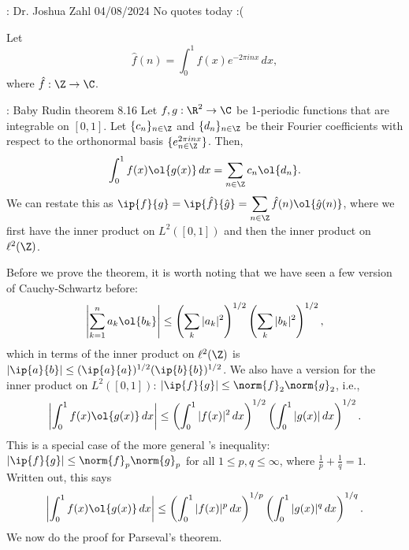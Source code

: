 \begin{nquote}{: Dr. Joshua Zahl 04/08/2024}
    No quotes today :(
\end{nquote}
\begin{notation}
    Let 
    \begin{equation*} 
        \hat{f}(n)=\int_0^1 f(x)e^{-2\pi inx} \, dx,
    \end{equation*} 
    where \(\hat{f}:\Z\to\C\).
\end{notation}

\begin{ntheorem}{: Baby Rudin theorem 8.16}
    Let \(f,g:\R^2\to\C\) be 1-periodic functions that are integrable on \([0,1]\). Let \(\{c_n\}_{n\in\Z}\) and \(\{d_n\}_{n\in\Z}\) be their Fourier coefficients with respect to the orthonormal basis \(\{e^{2\pi inx}_{n\in\Z}\}\). Then,
    \begin{equation*} 
        \int_0^1 f(x)\ol{g(x)} \, dx=\sum_{n\in\Z}c_n\ol{d_n}.
    \end{equation*}
    We can restate this as \(\ip{f}{g}=\ip{\hat{f}}{\hat{g}}=\displaystyle\sum_{n\in\Z}\hat{f}(n)\ol{\hat{g}(n)}\), where we first have the inner product on \(L^2([0,1])\) and then the inner product on \(\ell^2(\Z)\).
\end{ntheorem}
Before we prove the theorem, it is worth noting that we have seen a few version of Cauchy-Schwartz before:
\begin{equation*} 
    \left|\sum_{k=1}^n a_k\ol{b_k}\right|\leq\left(\sum_k|a_k|^2\right)^{1/2}\left(\sum_k|b_k|^2\right)^{1/2},
\end{equation*}
which in terms of the inner product on \(\ell^2(\Z)\) is \(|\ip{a}{b}|\leq(\ip{a}{a})^{1/2}(\ip{b}{b})^{1/2}\). We also have a version for the inner product on \(L^2([0,1])\): \(|\ip{f}{g}|\leq\norm{f}_2\norm{g}_2\), i.e., 
\begin{equation*} 
    \left|\int_0^1 f(x)\ol{g(x)} \, dx\right|\leq\left(\int_0^1 |f(x)|^2 \, dx\right)^{1/2}\left(\int_0^1 |g(x)| \, dx\right)^{1/2}.
\end{equation*}
This is a special case of the more general \Holder's inequality: \(|\ip{f}{g}|\leq\norm{f}_p\norm{g}_p\) for all \(1\leq p,q\leq\infty\), where \(\displaystyle\frac{1}{p}+\frac{1}{q}=1\). Written out, this says
\begin{equation*} 
    \left|\int_0^1 f(x)\ol{g(x)} \, dx\right|\leq\left(\int_0^1 |f(x)|^p \, dx\right)^{1/p}\left(\int_0^1 |g(x)|^q \, dx\right)^{1/q}.
\end{equation*}
We now do the proof for Parseval's theorem.
